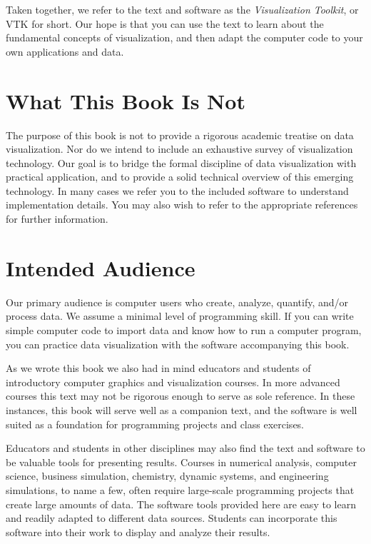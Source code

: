 Taken together, we refer to the text and software as the \emph{Visualization Toolkit}, or VTK for short. Our hope is that you can use the text to learn about the fundamental concepts of visualization, and then adapt the computer code to your own applications and data.

\section{What This Book Is Not}

The purpose of this book is not to provide a rigorous academic treatise on data visualization. Nor do we intend to include an exhaustive survey of visualization technology. Our goal is to bridge the formal discipline of data visualization with practical application, and to provide a solid technical overview of this emerging technology. In many cases we refer you to the included software to understand implementation details. You may also wish to refer to the appropriate references for further information.

\section{Intended Audience}

Our primary audience is computer users who create, analyze, quantify, and/or process data. We assume a minimal level of programming skill. If you can write simple computer code to import data and know how to run a computer program, you can practice data visualization with the software accompanying this book.

As we wrote this book we also had in mind educators and students of introductory computer graphics and visualization courses. In more advanced courses this text may not be rigorous enough to serve as sole reference. In these instances, this book will serve well as a companion text, and the software is well suited as a foundation for programming projects and class exercises.

Educators and students in other disciplines may also find the text and software to be valuable tools for presenting results. Courses in numerical analysis, computer science, business simulation, chemistry, dynamic systems, and engineering simulations, to name a few, often require large-scale programming projects that create large amounts of data. The software tools provided here are easy to learn and readily adapted to different data sources. Students can incorporate this software into their work to display and analyze their
results.

